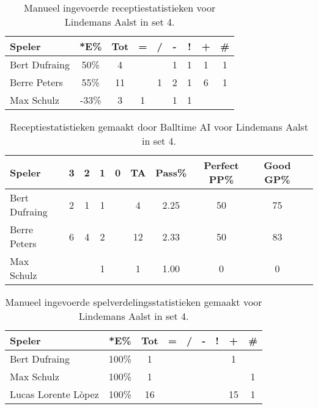 
\begin{table}[ht!]
    \centering
    \scriptsize
    \begin{tabular}{|l|c|c|c|c|c|c|c|c|}
        \hline
        \textbf{Speler} & *E\% & Tot & = & / & - & ! & + & \# \\ \hline
        Bert Dufraing & 50\% & 4 &  &  & 1 & 1 & 1 & 1\\ 
        Berre Peters & 55\% & 11 & & 1 & 2 & 1 & 6 & 1 \\ 
        Max Schulz & -33\% & 3 & 1 &  & 1 & 1 &  & \\ \hline
    \end{tabular}
    \caption[Manueel ingevoerde receptiestatistieken voor Lindemans Aalst in set 4]{\label{tab:PL3ReceiveAalstMan4}Manueel ingevoerde receptiestatistieken voor Lindemans Aalst in set 4.}
\end{table}

\begin{table}[ht!]
  \centering
  \scriptsize
    \begin{tabular}{|l|c|c|c|c|c|c|c|c|c|} \hline
    \textbf{Speler} & 3 & 2 & 1 & 0 & TA & Pass\% & Perfect PP\% & Good GP\% \\ \hline
    Bert Dufraing & 2 & 1 & 1 &   & 4 & 2.25 & 50 & 75 \\  
    Berre Peters & 6 & 4 & 2 &  & 12 & 2.33 & 50 & 83 \\
    Max Schulz &   &  &  1 &  & 1 & 1.00 & 0 & 0 \\\hline
  \end{tabular}
  \caption[Receptiestatistieken gemaakt door Balltime AI voor Lindemans Aalst in set 4]{\label{tab:PL3ReceiveAalstAI4}Receptiestatistieken gemaakt door Balltime AI voor Lindemans Aalst in set 4.}
\end{table}


\begin{table}[ht!]
    \centering
    \scriptsize
    \begin{tabular}{|l|c|c|c|c|c|c|c|c|}
        \hline
        \textbf{Speler} & *E\% & Tot & = & / & - & ! & + & \# \\ \hline
        Bert Dufraing & 100\% & 1 &  &  &  & & 1 &  \\ 
        Max Schulz & 100\% & 1 &  &  &  & & & 1 \\ 
        Lucas Lorente Lòpez & 100\% & 16 &  &  &  &  & 15 & 1 \\ \hline
    \end{tabular}
    \caption[Manueel ingevoerde spelverdelingsstatistieken gemaakt voor Lindemans Aalst in set 4]{\label{tab:PL3SetAalstMan4}Manueel ingevoerde spelverdelingsstatistieken gemaakt voor Lindemans Aalst in set 4.}
\end{table}

